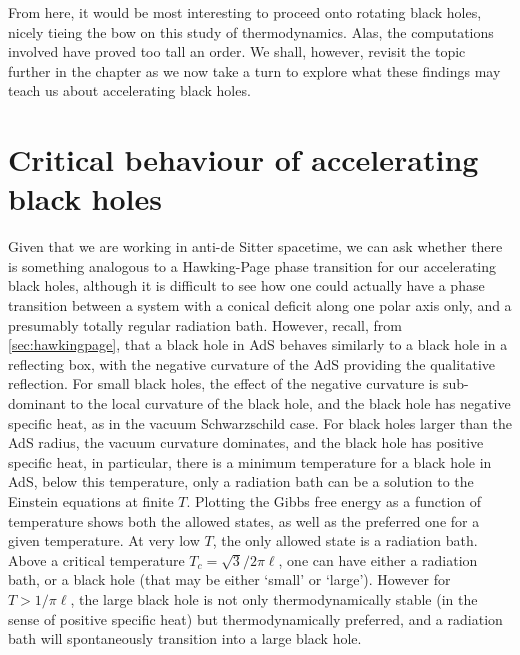 \documentclass[
twoside,
openright,
frontopenright,
]{dmathesis}
\begin{document}
From here, it would be most interesting to proceed onto rotating black holes,
nicely tieing the bow on this study of thermodynamics. Alas, the computations
involved have proved too tall an order. We shall, however, revisit the topic
further in the chapter as we now take a turn to explore what these findings may
teach us about accelerating black holes.

\section{Critical behaviour of accelerating black holes}

Given that we are working in anti-de Sitter spacetime, we can ask whether there
is something analogous to a Hawking-Page phase transition \cite{Hawking:1982dh}
for our accelerating black holes, although it is difficult to see how one could
actually have a phase transition between a system with a conical deficit along
one polar axis only, and a presumably totally regular radiation bath.  However,
recall, from \cref{sec:hawkingpage}, that a black hole in AdS behaves similarly
to a black hole in a reflecting box, with the negative curvature of the AdS
providing the qualitative reflection. For small black holes, the effect of the
negative curvature is sub-dominant to the local curvature of the black hole, and
the black hole has negative specific heat, as in the vacuum Schwarzschild
case. For black holes larger than the AdS radius, the vacuum curvature
dominates, and the black hole has positive specific heat, in particular, there
is a minimum temperature for a black hole in AdS, below this temperature, only a
radiation bath can be a solution to the Einstein equations at finite
$T$. Plotting the Gibbs free energy as a function of temperature shows both the
allowed states, as well as the preferred one for a given temperature.  At very
low $T$, the only allowed state is a radiation bath. Above a critical
temperature $T_c = \sqrt{3}/2\pi\ell$, one can have either a radiation bath, or
a black hole (that may be either `small' or `large'). However for $T>1/\pi\ell$,
the large black hole is not only thermodynamically stable (in the sense of
positive specific heat) but thermodynamically preferred, and a radiation bath
will spontaneously transition into a large black hole.
\end{document}
